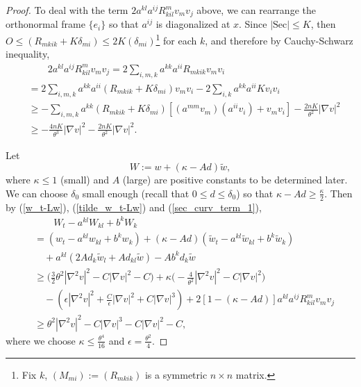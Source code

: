 \documentclass[12pt]{amsart}
\theoremstyle{definition}
\theoremstyle{remark}
\numberwithin{equation}{section}
\begin{document}
\begin{proof}
	
	To deal with the term $2 a^{kl} a^{ij} R^m_{kil} v_m v_j$ above, we can rearrange the orthonormal frame $\{e_i\}$ so that $a^{ij}$ is diagonalized at $x$. Since $|\text{Sec}| \leq K$, then $O \leq (R_{mkik} + K \delta_{mi}) \leq 2K(\delta_{mi})$\footnote{Fix $k$, $(M_{mi}) := (R_{mkik})$ is a symmetric $n\times n$ matrix.} for each $k$, and therefore by Cauchy-Schwarz inequality,
	\begin{equation}\label{sec_curv_term_1}
	\begin{aligned}
	&\qquad 2 a^{kl} a^{ij} R^m_{kil} v_m v_j
	= 2 \sum_{i, m, k} a^{kk} a^{ii} R_{mkik} v_m v_i \\
	&= 2 \sum_{i, m, k} a^{kk} a^{ii} (R_{mkik} + K \delta_{mi}) v_m v_i -2 \sum_{i, k} a^{kk} a^{ii}  K v_i v_i \\
	&\geq - \sum_{i, m, k} a^{kk} (R_{mkik} + K \delta_{mi})[(a^{mm}v_m)(a^{ii} v_i) + v_m v_i] - \frac{2nK}{\theta^2} |\nabla v|^2 \\
	& \geq - \frac{4nK}{\theta^3} |\nabla v|^2 - \frac{2nK}{\theta^2} |\nabla v|^2.
	\end{aligned}
	\end{equation}
	
	Let $$W := w + (\kappa - Ad)\tilde{w},$$ 
	where $\kappa \leq 1$ (small) and $A$ (large) are positive constants to be determined later. 
	We can choose $\delta_0$ small enough (recall that $0 \leq d \leq \delta_0$) so that $\kappa - Ad \geq \frac{\kappa}{2}$. Then by (\ref{w_t-Lw}), (\ref{tilde_w_t-Lw}) and (\ref{sec_curv_term_1}),
	\begin{equation}\label{Cap_w_t-Lw}
	\begin{aligned}
	&\qquad W_t - a^{kl} W_{kl} + b^k W_k \\
	&= (w_t - a^{kl} w_{kl} + b^k w_k) + (\kappa - Ad) (\tilde{w}_t - a^{kl} \tilde{w}_{kl} + b^k \tilde{w}_k) \\
	& \quad + a^{kl} (2 A d_k \tilde{w}_l + A d_{kl} \tilde{w}) -A b^k d_k \tilde{w} \\
	&\geq \Big(\frac{3}{2}\theta^2 |\nabla^2 v|^2 - C |\nabla v|^2 - C\Big) + \kappa \Big(- \frac{4}{\theta^2} |\nabla^2 v|^2 - C |\nabla v|^2\Big) \\
	&\quad - (\epsilon|\nabla^2 v|^2 + \frac{C}{\epsilon} |\nabla v|^2 + C |\nabla v|^3) + 2 [1 - (\kappa - Ad)] a^{kl} a^{ij} R^m_{kil} v_m v_j\\
	& \geq \theta^2 |\nabla^2 v|^2 - C|\nabla v|^3 - C |\nabla v|^2 - C,
	\end{aligned}
	\end{equation}
	where we choose $\kappa \leq \frac{\theta^4}{16}$ and $\epsilon = \frac{\theta^2}{4}$.
	

\end{proof}
\end{document}
